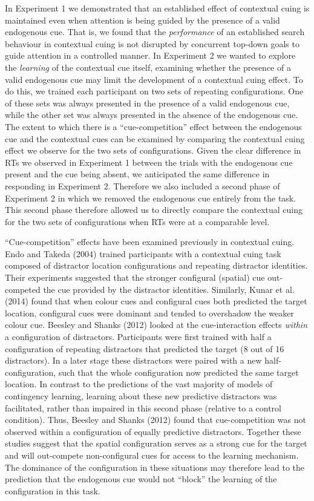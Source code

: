 \documentclass[
  man,floatsintext]{apa7}
\begin{document}
In Experiment 1 we demonstrated that an established effect of contextual cuing is maintained even when attention is being guided by the presence of a valid endogenous cue. That is, we found that the \emph{performance} of an established search behaviour in contextual cuing is not disrupted by concurrent top-down goals to guide attention in a controlled manner. In Experiment 2 we wanted to explore the \emph{learning} of the contextual cue itself, examining whether the presence of a valid endogenous cue may limit the development of a contextual cuing effect. To do this, we trained each participant on two sets of repeating configurations. One of these sets was always presented in the presence of a valid endogenous cue, while the other set was always presented in the absence of the endogenous cue. The extent to which there is a ``cue-competition'' effect between the endogenous cue and the contextual cues can be examined by comparing the contextual cuing effect we observe for the two sets of configurations. Given the clear difference in RTs we observed in Experiment 1 between the trials with the endogenous cue present and the cue being absent, we anticipated the same difference in responding in Experiment 2. Therefore we also included a second phase of Experiment 2 in which we removed the endogenous cue entirely from the task. This second phase therefore allowed us to directly compare the contextual cuing for the two sets of configurations when RTs were at a comparable level.

``Cue-competition'' effects have been examined previously in contextual cuing. Endo and Takeda (2004) trained participants with a contextual cuing task composed of distractor location configurations and repeating distractor identities. Their experiments suggested that the stronger configural (spatial) cue out-competed the cue provided by the distractor identities. Similarly, Kunar et al. (2014) found that when colour cues and configural cues both predicted the target location, configural cues were dominant and tended to overshadow the weaker colour cue. Beesley and Shanks (2012) looked at the cue-interaction effects \emph{within} a configuration of distractors. Participants were first trained with half a configuration of repeating distractors that predicted the target (8 out of 16 distractors). In a later stage these distractors were paired with a new half-configuration, such that the whole configuration now predicted the same target location. In contrast to the predictions of the vast majority of models of contingency learning, learning about these new predictive distractors was facilitated, rather than impaired in this second phase (relative to a control condition). Thus, Beesley and Shanks (2012) found that cue-competition was not observed within a configuration of equally predictive distractors. Together these studies suggest that the spatial configuration serves as a strong cue for the target and will out-compete non-configural cues for access to the learning mechanism. The dominance of the configuration in these situations may therefore lead to the prediction that the endogenous cue would not ``block'' the learning of the configuration in this task.
\end{document}
